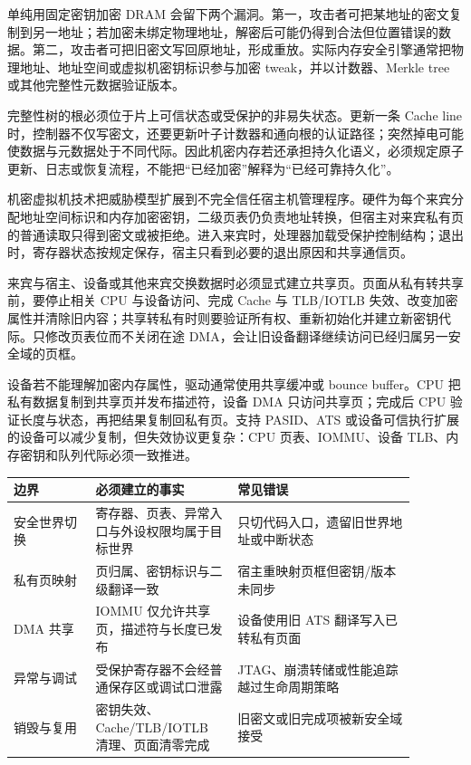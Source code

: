 
单纯用固定密钥加密 DRAM 会留下两个漏洞。第一，攻击者可把某地址的密文复制到另一地址；若加密未绑定物理地址，解密后可能仍得到合法但位置错误的数据。第二，攻击者可把旧密文写回原地址，形成重放。实际内存安全引擎通常把物理地址、地址空间或虚拟机密钥标识参与加密 tweak，并以计数器、Merkle tree 或其他完整性元数据验证版本。

完整性树的根必须位于片上可信状态或受保护的非易失状态。更新一条 Cache line 时，控制器不仅写密文，还要更新叶子计数器和通向根的认证路径；突然掉电可能使数据与元数据处于不同代际。因此机密内存若还承担持久化语义，必须规定原子更新、日志或恢复流程，不能把“已经加密”解释为“已经可靠持久化”。


机密虚拟机技术把威胁模型扩展到不完全信任宿主机管理程序。硬件为每个来宾分配地址空间标识和内存加密密钥，二级页表仍负责地址转换，但宿主对来宾私有页的普通读取只得到密文或被拒绝。进入来宾时，处理器加载受保护控制结构；退出时，寄存器状态按规定保存，宿主只看到必要的退出原因和共享通信页。

来宾与宿主、设备或其他来宾交换数据时必须显式建立共享页。页面从私有转共享前，要停止相关 CPU 与设备访问、完成 Cache 与 TLB/IOTLB 失效、改变加密属性并清除旧内容；共享转私有时则要验证所有权、重新初始化并建立新密钥代际。只修改页表位而不关闭在途 DMA，会让旧设备翻译继续访问已经归属另一安全域的页框。


设备若不能理解加密内存属性，驱动通常使用共享缓冲或 bounce buffer。CPU 把私有数据复制到共享页并发布描述符，设备 DMA 只访问共享页；完成后 CPU 验证长度与状态，再把结果复制回私有页。支持 PASID、ATS 或设备可信执行扩展的设备可以减少复制，但失效协议更复杂：CPU 页表、IOMMU、设备 TLB、内存密钥和队列代际必须一致推进。

\begin{longtable}{L{0.18\linewidth}L{0.31\linewidth}L{0.39\linewidth}}
\toprule
边界 & 必须建立的事实 & 常见错误 \\
\midrule
安全世界切换 & 寄存器、页表、异常入口与外设权限均属于目标世界 & 只切代码入口，遗留旧世界地址或中断状态 \\\tablerowrule
私有页映射 & 页归属、密钥标识与二级翻译一致 & 宿主重映射页框但密钥/版本未同步 \\\tablerowrule
DMA 共享 & IOMMU 仅允许共享页，描述符与长度已发布 & 设备使用旧 ATS 翻译写入已转私有页面 \\\tablerowrule
异常与调试 & 受保护寄存器不会经普通保存区或调试口泄露 & JTAG、崩溃转储或性能追踪越过生命周期策略 \\\tablerowrule
销毁与复用 & 密钥失效、Cache/TLB/IOTLB 清理、页面清零完成 & 旧密文或旧完成项被新安全域接受 \\
\bottomrule
\end{longtable}


